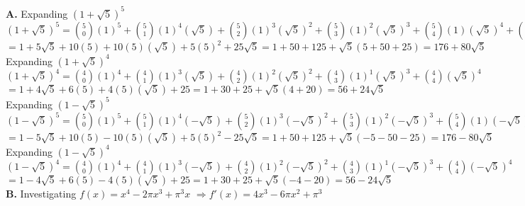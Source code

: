 \documentclass{homework}
\begin{document}
\begin{flushleft}
    \textbf{A. }Expanding $(1+\sqrt{5})^5$ \vspace{0.5em} \\
    $(1+\sqrt{5})^5=\binom{5}{0}(1)^5+\binom{5}{1}(1)^4(\sqrt{5})+\binom{5}{2}(1)^3(\sqrt{5})^2+\binom{5}{3}(1)^2(\sqrt{5})^3+\binom{5}{4}(1)(\sqrt{5})^4+\binom{5}{5}(\sqrt{5})^5$ \vspace{0.4em}\\
    $=1+5\sqrt{5}+10(5)+10(5)(\sqrt{5})+5(5)^2+25\sqrt{5}=1+50+125+\sqrt{5}(5+50+25)=176+80\sqrt{5}$ \vspace{1.1em}\\
    Expanding $(1+\sqrt{5})^4$ \vspace{0.5em} \\
    $(1+\sqrt{5})^4=\binom{4}{0}(1)^4+\binom{4}{1}(1)^3(\sqrt{5})+\binom{4}{2}(1)^2(\sqrt{5})^2+\binom{4}{3}(1)^1(\sqrt{5})^3+\binom{4}{4}(\sqrt{5})^4$ \vspace{0.4em}\\
    $=1+4\sqrt{5}+6(5)+4(5)(\sqrt{5})+25=1+30+25+\sqrt{5}(4+20)=56+24\sqrt{5}$ \vspace{1.4em}\\
    Expanding $(1-\sqrt{5})^5$ \vspace{0.5em} \\
    $(1-\sqrt{5})^5=\binom{5}{0}(1)^5+\binom{5}{1}(1)^4(-\sqrt{5})+\binom{5}{2}(1)^3(-\sqrt{5})^2+\binom{5}{3}(1)^2(-\sqrt{5})^3+\binom{5}{4}(1)(-\sqrt{5})^4+\binom{5}{5}(-\sqrt{5})^5$ \vspace{0.4em}\\
    $=1-5\sqrt{5}+10(5)-10(5)(\sqrt{5})+5(5)^2-25\sqrt{5}=1+50+125+\sqrt{5}(-5-50-25)=176-80\sqrt{5}$ \vspace{1.1em}\\
    Expanding $(1-\sqrt{5})^4$ \vspace{0.5em} \\
    $(1-\sqrt{5})^4=\binom{4}{0}(1)^4+\binom{4}{1}(1)^3(-\sqrt{5})+\binom{4}{2}(1)^2(-\sqrt{5})^2+\binom{4}{3}(1)^1(-\sqrt{5})^3+\binom{4}{4}(-\sqrt{5})^4$ \vspace{0.4em}\\
    $=1-4\sqrt{5}+6(5)-4(5)(\sqrt{5})+25=1+30+25+\sqrt{5}(-4-20)=56-24\sqrt{5}$
    \vspace{1.4em} \\
    \textbf{B. }
    Investigating $f(x)=x^4-2\pi x^3+\pi^3x$ \linebreak \linebreak
    $\Rightarrow f'(x)=4x^3-6 \pi x^2+\pi^3 $ \\

\end{flushleft}
\end{document}
